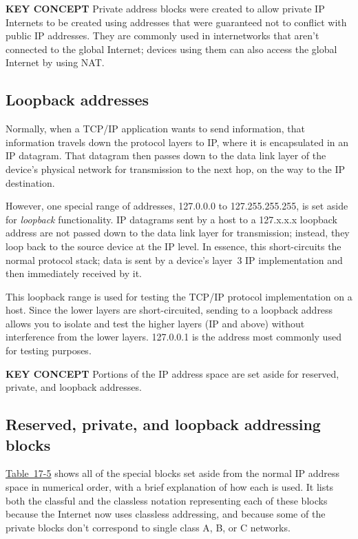 \documentclass[b5paper,11pt]{memoir}
\begin{document}
{\textbf{KEY CONCEPT}} Private address blocks were created to allow
private IP Internets to be created using addresses that were guaranteed
not to conflict with public IP addresses. They are commonly used in
internetworks that aren't connected to the global Internet; devices
using them can also access the global Internet by using NAT.



\subsection{Loopback addresses}

Normally, when a TCP/IP application wants to send information, that
information travels down the protocol layers to IP, where it is
encapsulated in an IP datagram. That datagram then passes down to the
data link layer of the device's physical network for transmission to the
next hop, on the way to the IP
destination.\protect\hypertarget{ch17s05.htmlux5cux23idx-CHP-17-0703}{}{}

However, one special range of addresses, 127.0.0.0 to 127.255.255.255,
is set aside for {\emph{loopback}} functionality. IP datagrams sent by a
host to a 127.x.x.x loopback address are not passed down to the data
link layer for transmission; instead, they loop back to the source
device at the IP level. In essence, this short-circuits the normal
protocol stack; data is sent by a device's layer~3 IP implementation and
then immediately received by it.

This loopback range is used for testing the TCP/IP protocol
implementation on a host. Since the lower layers are short-circuited,
sending to a loopback address allows you to isolate and test the higher
layers (IP and above) without interference from the lower layers.
\protect\hypertarget{ch17s05.htmlux5cux23idx-CHP-17-0704}{}{}127.0.0.1
is the address most commonly used for testing purposes.


{\textbf{KEY CONCEPT}} Portions of the IP address space are set aside
for reserved, private, and loopback addresses.




\subsection{Reserved, private, and loopback addressing blocks}

\protect\hyperlink{ch17s05.htmlux5cux23reserved_private_and_loopback_ip_address}{Table~17-5}
shows all of the special blocks set aside from the normal
\protect\hypertarget{ch17s05.htmlux5cux23idx-CHP-17-0705}{}{}IP address
space in numerical order, with a brief explanation of how each is used.
It lists both the classful and the classless notation representing each of these blocks because the Internet now uses classless addressing, and because some of the private blocks don't correspond to single class A, B, or C networks.
\end{document}
